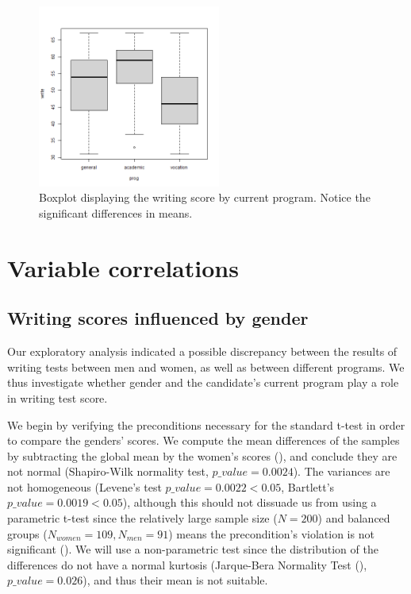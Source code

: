 \documentclass[10pt, a4paper]{article}
\begin{document}
	\begin{figure}
		\includegraphics[width=6cm]{write_prog_boxplot.png}
		\centering
		\caption{Boxplot displaying the writing score by current program. Notice the significant differences in means.}
		\label{fig::write_prog}
	\end{figure}
	
	\section{Variable correlations}
	\label{sec::var_cors}
	
	\subsection{Writing scores influenced by gender}
	Our exploratory analysis indicated a possible discrepancy between the results of writing tests between men and women, as well as between different programs. We thus investigate whether gender and the candidate's current program play a role in writing test score.
	
	We begin by verifying the preconditions necessary for the standard t-test in order to compare the genders' scores. We compute the mean differences of the samples by subtracting the global mean by the women's scores (\textcite{means}), and conclude they are not normal (Shapiro-Wilk normality test, $p\_value = 0.0024$). The variances are not homogeneous (Levene's test $p\_value = 0.0022 < 0.05$, Bartlett's $p\_value = 0.0019 < 0.05$), although this should not dissuade us from using a parametric t-test since the relatively large sample size ($N=200$) and balanced groups ($N_{women} = 109, N_{men} = 91$) means the precondition's violation is not significant (\textcite{variances}). We will use a non-parametric test since the distribution of the differences do not have a normal kurtosis (Jarque-Bera Normality Test (\textcite{jarque}), $p\_value=0.026$), and thus their mean is not suitable.
	
\end{document}
